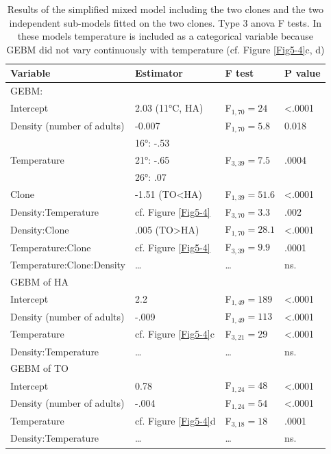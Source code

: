 \begin{table}[!ht] \centering \caption{ Results of the simplified mixed model
including the two clones and the two independent sub-models fitted on the two
clones. Type 3 anova F tests. In these models temperature is included as a
categorical variable because GEBM did not vary continuously with temperature
(cf. Figure \ref{Fig5-4}c, d)}\label{tab5-3}
\begin{tabular}{llll}
\hline
Variable & Estimator & F test & P value \\
 \hline \hline
GEBM: & & & \\
Intercept & 2.03 (11°C, HA) & F$_{1,70}=24$ & <.0001 \\
Density (number of adults) & -0.007 & F$_{1,70}=5.8$ & 0.018\\
\multirow{3}{*}{Temperature} & 16°: -.53 & \multirow{3}{*}{F$_{3,39}=7.5$} & \multirow{3}{*}{.0004} \\
 & 21°: -.65 & & \\
 & 26°: .07 & & \\
 Clone & -1.51 (TO<HA) & F$_{1,39}=51.6$ & <.0001\\
 Density:Temperature & cf. Figure \ref{Fig5-4} & F$_{3,70}=3.3$ & .002\\
 Density:Clone & .005 (TO>HA) & F$_{1,70}=28.1$ & <.0001\\
 Temperature:Clone & cf. Figure \ref{Fig5-4} & F$_{3,39}=9.9$ & .0001\\
 Temperature:Clone:Density & \ldots & \ldots & ns.\\
 \hline
 GEBM of HA & & & \\
 Intercept & 2.2 & F$_{1,49}=189$ & <.0001\\
 Density (number of adults) & -.009 & F$_{1,49}=113$ & <.0001\\
 Temperature & cf. Figure \ref{Fig5-4}c & F$_{3,21}=29$ & <.0001\\
 Density:Temperature &\ldots&\ldots& ns.\\
 \hline
 GEBM of TO & & & \\
 Intercept & 0.78 & F$_{1,24}=48$ & <.0001\\
 Density (number of adults) & -.004 & F$_{1,24}=54$ & <.0001\\
 Temperature & cf. Figure \ref{Fig5-4}d & F$_{3,18}=18$ & .0001\\
 Density:Temperature &\ldots&\ldots& ns.\\
\hline \hline
\end{tabular}

\end{table}

